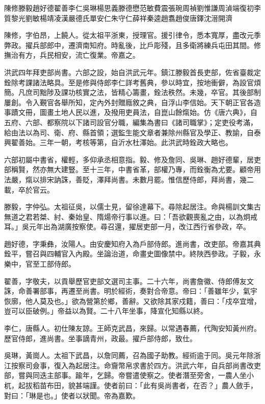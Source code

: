 
\begin{pinyinscope}
陳修滕毅趙好德翟善李仁吳琳楊思義滕德懋范敏費震張琬周禎劉惟謙周湞端復初李質黎光劉敏楊靖凌漢嚴德氏單安仁朱守仁薛祥秦逵趙翥趙俊唐鐸沈溍開濟

陳修，字伯昂，上饒人。從太祖平浙東，授理官。援引律令，悉本寬厚，盡改元季弊政。擢兵部郎中，遷濟南知府。時亂後，比戶彫殘，且多衛將練兵屯田其間。修撫治有方，兵民相安，流亡復業。帝嘉之。

洪武四年拜吏部尚書。六部之設，始自洪武元年。鎮江滕毅首長吏部，佐省臺裁定銓除考課諸法略具。至是修與侍郎李仁詳考舊典，參以時宜，按地衝僻，為設官煩簡。凡庶司黜陟及課功核實之法，皆精心籌畫，銓法秩然。未幾，卒官。其後部制屢創。令入覲官各舉所知，定內外封贈廕敘之典，自浮山李信始。天下朝正官各造事蹟文冊，圖畫土地人民以進，及撥用吏員法，自崑山餘熂始。仿《唐六典》，自五府、六部、都察院以下諸司設官分職，編集為書曰《諸司職掌》；定吏役考滿，給由法以為司、衛、府、縣首領；選監生能文章者兼除州縣官及學正、教諭，自泰興翟善始。三年一朝，考核等第，自沂水杜澤始。此洪武時銓政大略也。

六部初屬中書省，權輕，多仰承丞相意指。毅、修及詹同、吳琳、趙好德輩，居吏部稱賢，然亦無大建豎。至十三年，中書省革，部權乃專，而銓衡為尤要。顧帝用法嚴，熂以排宋訥誅，善貶，澤拜尚書。未數月罷。惟信歷侍郎，拜尚書，幾二載，卒於官云。

滕毅，字仲弘。太祖征吳，以儒士見，留徐達幕下。尋除起居注。命與楊訓文集古無道之君若桀、紂、秦始皇、隋煬帝行事以進。曰：「吾欲觀喪亂之由，以為炯戒耳。」吳元年出為湖廣按察使。尋召還，擢居吏部一月，改江西行省參政，卒。

趙好德，字秉彝，汝陽人。由安慶知府入為戶部侍郎。進尚書，改吏部。帝嘉其典銓平，嘗召與四輔官入內殿。坐論治道，命畫史圖像禁中。終陜西參政。子毅，永樂中，官至工部侍郎。

翟善，字敬夫，以貢舉歷官吏部文選司主事。二十六年，尚書詹徽、侍郎傅友文誅，命善署部事，再遷至尚書。明於經術，奏對合帝意。帝曰：「善雖年少，氣宇恢廓，他人莫及也。」欲為營第於鄉，善辭。又欲除其家戍籍，善曰：「戍卒宜增，豈可以臣破例。」帝益以為賢。二十八年坐事，降宣化知縣以終。

李仁，唐縣人。初仕陳友諒。王師克武昌，來歸。以常遇春薦，代陶安知黃州府。歷官侍郎，進尚書。坐事謫青州，政最。擢戶部侍郎，致仕。

吳琳，黃崗人。太祖下武昌，以詹同薦，召為國子助教。經術逾于同。吳元年除浙江按察司僉事，復入為起居注。命齎幣帛求書於四方。洪武六年，自兵部尚書改吏部，嘗與同迭主部事。踰年，乞歸。帝嘗遣使察之。使者潛至旁舍，一農人坐小杌，起拔稻苗布田，貌甚端謹。使者前曰：「此有吳尚書者，在否？」農人斂手，對曰：「琳是也。」使者以狀聞。帝為嘉歎。


\end{pinyinscope}
